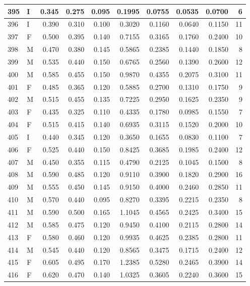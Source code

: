 \documentclass[9pt,twocolumn,twoside,]{pnas-new}
\begin{document}
\begin{tabular}{l|l|r|r|r|r|r|r|r|r}
\hline
395 & I & 0.345 & 0.275 & 0.095 & 0.1995 & 0.0755 & 0.0535 & 0.0700 & 6\\
\hline
396 & I & 0.390 & 0.310 & 0.100 & 0.3020 & 0.1160 & 0.0640 & 0.1150 & 11\\
\hline
397 & F & 0.500 & 0.395 & 0.140 & 0.7155 & 0.3165 & 0.1760 & 0.2400 & 10\\
\hline
398 & M & 0.470 & 0.380 & 0.145 & 0.5865 & 0.2385 & 0.1440 & 0.1850 & 8\\
\hline
399 & M & 0.535 & 0.440 & 0.150 & 0.6765 & 0.2560 & 0.1390 & 0.2600 & 12\\
\hline
400 & M & 0.585 & 0.455 & 0.150 & 0.9870 & 0.4355 & 0.2075 & 0.3100 & 11\\
\hline
401 & F & 0.485 & 0.365 & 0.120 & 0.5885 & 0.2700 & 0.1310 & 0.1750 & 9\\
\hline
402 & M & 0.515 & 0.455 & 0.135 & 0.7225 & 0.2950 & 0.1625 & 0.2350 & 9\\
\hline
403 & F & 0.435 & 0.325 & 0.110 & 0.4335 & 0.1780 & 0.0985 & 0.1550 & 7\\
\hline
404 & F & 0.515 & 0.415 & 0.140 & 0.6935 & 0.3115 & 0.1520 & 0.2000 & 10\\
\hline
405 & I & 0.440 & 0.345 & 0.120 & 0.3650 & 0.1655 & 0.0830 & 0.1100 & 7\\
\hline
406 & F & 0.525 & 0.440 & 0.150 & 0.8425 & 0.3685 & 0.1985 & 0.2400 & 12\\
\hline
407 & M & 0.450 & 0.355 & 0.115 & 0.4790 & 0.2125 & 0.1045 & 0.1500 & 8\\
\hline
408 & M & 0.590 & 0.485 & 0.120 & 0.9110 & 0.3900 & 0.1820 & 0.2900 & 16\\
\hline
409 & M & 0.555 & 0.450 & 0.145 & 0.9150 & 0.4000 & 0.2460 & 0.2850 & 11\\
\hline
410 & M & 0.570 & 0.440 & 0.095 & 0.8270 & 0.3395 & 0.2215 & 0.2350 & 8\\
\hline
411 & M & 0.590 & 0.500 & 0.165 & 1.1045 & 0.4565 & 0.2425 & 0.3400 & 15\\
\hline
412 & M & 0.585 & 0.475 & 0.120 & 0.9450 & 0.4100 & 0.2115 & 0.2800 & 14\\
\hline
413 & F & 0.580 & 0.460 & 0.120 & 0.9935 & 0.4625 & 0.2385 & 0.2800 & 11\\
\hline
414 & M & 0.545 & 0.440 & 0.120 & 0.8565 & 0.3475 & 0.1715 & 0.2400 & 12\\
\hline
415 & F & 0.605 & 0.495 & 0.170 & 1.2385 & 0.5280 & 0.2465 & 0.3900 & 14\\
\hline
416 & F & 0.620 & 0.470 & 0.140 & 1.0325 & 0.3605 & 0.2240 & 0.3600 & 15\\

\end{tabular}
\end{document}
